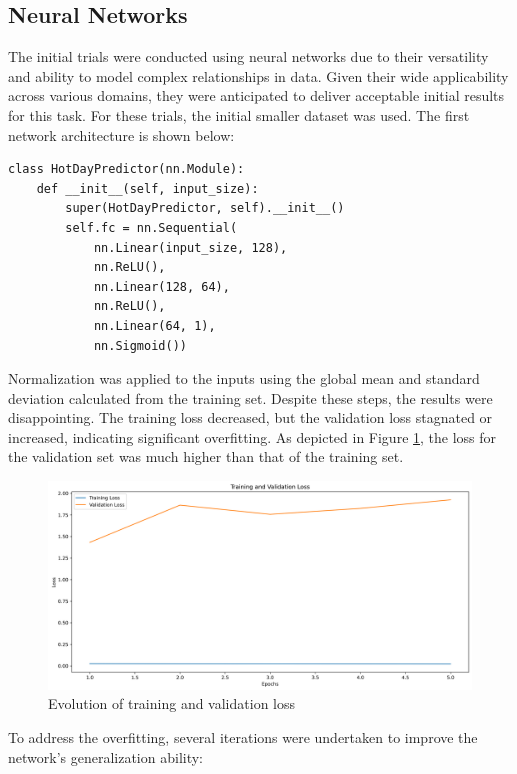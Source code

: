 \documentclass[conference,9pt]{IEEEtran}
\begin{document}
\subsection{Neural Networks}
The initial trials were conducted using neural networks due to their versatility and ability to model complex relationships in data. Given their wide applicability across various domains, they were anticipated to deliver acceptable initial results for this task. For these trials, the initial smaller dataset was used. The first network architecture is shown below:
\begin{lstlisting}
class HotDayPredictor(nn.Module):
    def __init__(self, input_size):
        super(HotDayPredictor, self).__init__()
        self.fc = nn.Sequential(
            nn.Linear(input_size, 128),
            nn.ReLU(),
            nn.Linear(128, 64),
            nn.ReLU(),
            nn.Linear(64, 1),
            nn.Sigmoid())
\end{lstlisting}
Normalization was applied to the inputs using the global mean and standard deviation calculated from the training set. Despite these steps, the results were disappointing. The training loss decreased, but the validation loss stagnated or increased, indicating significant overfitting. As depicted in Figure \ref{fig:baseline}, the loss for the validation set was much higher than that of the training set.
\begin{figure}[!t]
    \centering
    \includegraphics[width=\columnwidth]{../training_validation_loss_baseline.png}
    \caption{Evolution of training and validation loss}
    \label{fig:baseline}
\end{figure}
To address the overfitting, several iterations were undertaken to improve the network's generalization ability:
\end{document}
